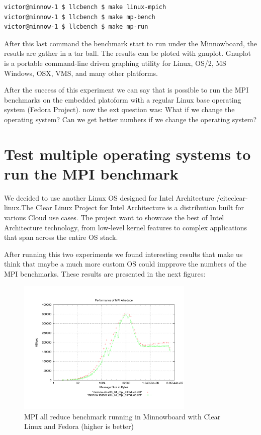 \begin{lstlisting}[frame=single,language=bash]
victor@minnow-1 $ llcbench $ make linux-mpich
victor@minnow-1 $ llcbench $ make mp-bench
victor@minnow-1 $ llcbench $ make mp-run
\end{lstlisting}

After this last command the benchmark start to run under the Minnowboard, the
resutls are gather in a tar ball. The results can be ploted with gnuplot.
Gnuplot is a portable command-line driven graphing utility for Linux, OS/2, MS
Windows, OSX, VMS, and many other platforms. 

After the success of this experiment we can say that is possible to run the MPI
benchmarks on the embedded platoform with a regular Linux base operating system
(Fedora Project). now the ext question was: What if we change the operating
system? Can we get better numbers if we change the operating system?


\section{Test multiple operating systems to run the MPI benchmark}

We decided to use another Linux OS designed for Intel Architecture
/cite{clear-linux}.The Clear Linux Project for Intel Architecture is a
distribution built for various Cloud use cases. The project  want to showcase
the best of Intel Architecture technology, from low-level kernel features to
complex applications that span across the entire OS stack.

After running this two experiments we found interesting results that make us
think that maybe a much more custom OS could impprove the numbers of the MPI
benchmarks. These results are presented in the next figures:

\begin{figure}[H]
\centering
\includegraphics[width=0.75\textwidth]{images/mpbench_clr_experiments/mpi_allreduce.pdf}
\caption{MPI all reduce benchmark running in Minnowboard with Clear Linux and
Fedora (higher is better)}
\label{fig:5.1}
\end{figure}



